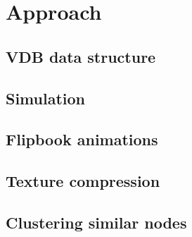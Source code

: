 \section{Approach} \label{approach}
\subsection{VDB data structure} \label{approach:vdb_data_structure}
\subsection{Simulation} \label{approach:simulation}
\subsection{Flipbook animations} \label{approach:flipbook_animations}
\subsection{Texture compression} \label{approach:texture_compression}
\subsection{Clustering similar nodes} \label{approach:clustering_similar_nodes}